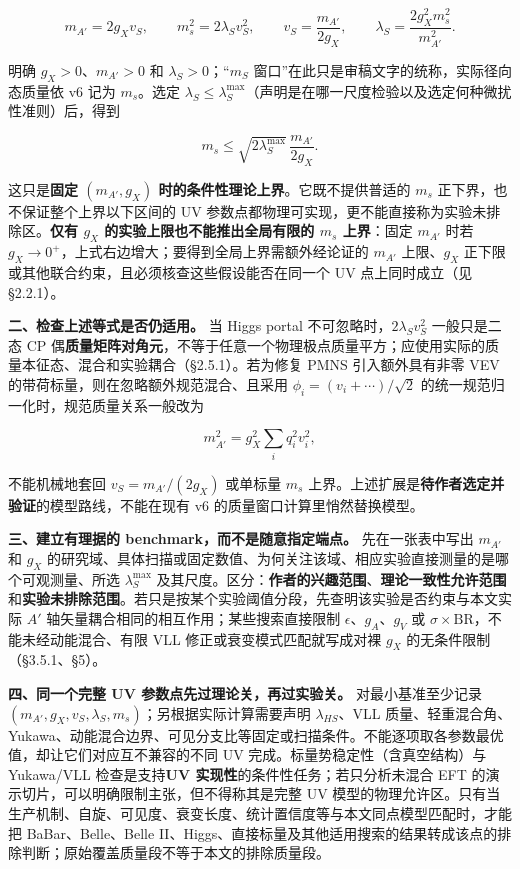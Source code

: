 \documentclass[
  chinese,
  UTF8]{ctexart}
\begin{document}
\[
 m_{A'}=2g_Xv_S,\qquad m_s^2=2\lambda_Sv_S^2,\qquad
 v_S=\frac{m_{A'}}{2g_X},\qquad
 \lambda_S=\frac{2g_X^2m_s^2}{m_{A'}^2}.
\]

明确 \(g_X>0\)、\(m_{A'}>0\) 和 \(\lambda_S>0\)；``\(m_S\)
窗口''在此只是审稿文字的统称，实际径向态质量依 v6 记为 \(m_s\)。选定
\(\lambda_S\leq\lambda_S^{\max}\)（声明是在哪一尺度检验以及选定何种微扰性准则）后，得到

\[
 m_s\leq\sqrt{2\lambda_S^{\max}}\,\frac{m_{A'}}{2g_X}.
\]

这只是\textbf{固定 \((m_{A'},g_X)\)
时的条件性理论上界}。它既不提供普适的 \(m_s\)
正下界，也不保证整个上界以下区间的 UV
参数点都物理可实现，更不能直接称为实验未排除区。\textbf{仅有 \(g_X\)
的实验上限也不能推出全局有限的 \(m_s\) 上界}：固定 \(m_{A'}\) 时若
\(g_X\to0^+\)，上式右边增大；要得到全局上界需额外经论证的 \(m_{A'}\)
上限、\(g_X\) 正下限或其他联合约束，且必须核查这些假设能否在同一个 UV
点上同时成立（见 §2.2.1）。

\textbf{二、检查上述等式是否仍适用。} 当 Higgs portal
不可忽略时，\(2\lambda_Sv_S^2\) 一般只是二态 CP
偶\textbf{质量矩阵对角元}，不等于任意一个物理极点质量平方；应使用实际的质量本征态、混合和实验耦合（§2.5.1）。若为修复
PMNS 引入额外具有非零 VEV 的带荷标量，则在忽略额外规范混合、且采用
\(\phi_i=(v_i+\cdots)/\sqrt2\) 的统一规范归一化时，规范质量关系一般改为

\[
 m_{A'}^2=g_X^2\sum_i q_i^2v_i^2,
\]

不能机械地套回 \(v_S=m_{A'}/(2g_X)\) 或单标量 \(m_s\)
上界。上述扩展是\textbf{待作者选定并验证}的模型路线，不能在现有 v6
的质量窗口计算里悄然替换模型。

\textbf{三、建立有理据的 benchmark，而不是随意指定端点。}
先在一张表中写出 \(m_{A'}\) 和 \(g_X\)
的研究域、具体扫描或固定数值、为何关注该域、相应实验直接测量的是哪个可观测量、所选
\(\lambda_S^{\max}\)
及其尺度。区分：\textbf{作者的兴趣范围}、\textbf{理论一致性允许范围}和\textbf{实验未排除范围}。若只是按某个实验阈值分段，先查明该实验是否约束与本文实际
\(A'\) 轴矢量耦合相同的相互作用；某些搜索直接限制
\(\epsilon\)、\(g_A\)、\(g_V\) 或
\(\sigma\times\mathrm{BR}\)，不能未经动能混合、有限 VLL
修正或衰变模式匹配就写成对裸 \(g_X\) 的无条件限制（§3.5.1、§5）。

\textbf{四、同一个完整 UV 参数点先过理论关，再过实验关。}
对最小基准至少记录
\((m_{A'},g_X,v_S,\lambda_S,m_s)\)；另根据实际计算需要声明
\(\lambda_{HS}\)、VLL
质量、轻重混合角、Yukawa、动能混合边界、可见分支比等固定或扫描条件。不能逐项取各参数最优值，却让它们对应互不兼容的不同
UV 完成。标量势稳定性（含真空结构）与 Yukawa/VLL 检查是支持\textbf{UV
实现性}的条件性任务；若只分析未混合 EFT
的演示切片，可以明确限制主张，但不得称其是完整 UV
模型的物理允许区。只有当生产机制、自旋、可见度、衰变长度、统计置信度等与本文同点模型匹配时，才能把
BaBar、Belle、Belle
II、Higgs、直接标量及其他适用搜索的结果转成该点的排除判断；原始覆盖质量段不等于本文的排除质量段。
\end{document}
